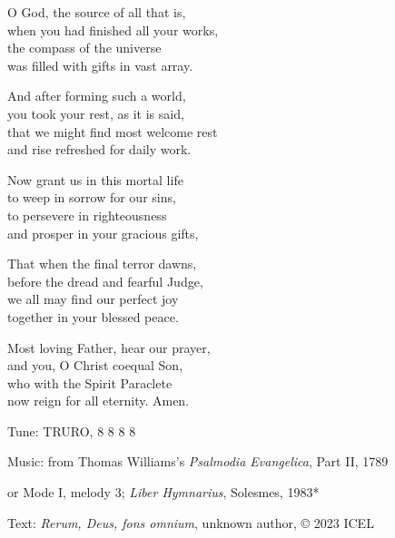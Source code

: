 \hymn

\begin{hymnverse}
O God, the source of all that is,\\
when you had finished all your works,\\
the compass of the universe\\
was filled with gifts in vast array.

And after forming such a world,\\
you took your rest, as it is said,\\
that we might find most welcome rest\\
and rise refreshed for daily work.

Now grant us in this mortal life\\
to weep in sorrow for our sins,\\
to persevere in righteousness\\
and prosper in your gracious gifts,

That when the final terror dawns,\\
before the dread and fearful Judge,\\
we all may find our perfect joy\\
together in your blessed peace.

Most loving Father, hear our prayer,\\
and you, O Christ coequal Son,\\
who with the Spirit Paraclete\\
now reign for all eternity. Amen.
\end{hymnverse}

\begin{hymnsource}
Tune: TRURO, 8 8 8 8

Music: from Thomas Williams’s \emph{Psalmodia Evangelica}, Part II, 1789

or Mode I, melody 3; \emph{Liber Hymnarius}, Solesmes, 1983*

Text: \emph{Rerum, Deus, fons omnium}, unknown author, © 2023 ICEL
\end{hymnsource}
